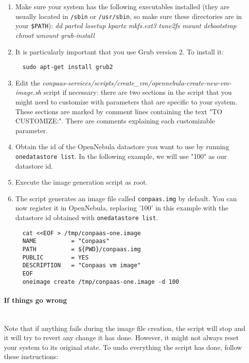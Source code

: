 \documentclass[10pt]{article}
\begin{document}
\begin{enumerate}
\item Make sure your system has the following executables installed
  (they are usually located in \verb+/sbin+ or \verb+/usr/sbin+, so
  make sure these directories are in your \verb+$PATH+): %
  \emph{dd parted losetup kpartx mkfs.ext3 tune2fs mount debootstrap
    chroot umount grub-install}
\item It is particularly important that you use Grub version 2. To
  install it:
  \begin{verbatim}
  sudo apt-get install grub2
  \end{verbatim}
\item Edit the
  \textit{conpaas-services/scripts/create\_vm/opennebula-create-new-vm-image.sh} script
  if necessary: there are two sections in the script that you might need
  to customize with parameters that are specific to your system. These
  sections are marked by comment lines containing the text "TO CUSTOMIZE:".
  There are comments explaining each customizable parameter. 
\item Obtain the id of the OpenNebula datastore you want to use by running
  \verb+onedatastore list+. In the following example, we will use "100" as our datastore id.
\item Execute the image generation script as root.
\item The script generates an image file called \verb+conpaas.img+ by default.
You can now register it in OpenNebula, replacing '100' in this example with the
datastore id obtained with \verb+onedatastore list+.

\vspace{10 mm}

\begin{verbatim}
  cat <<EOF > /tmp/conpaas-one.image
  NAME          = "Conpaas"
  PATH          = ${PWD}/conpaas.img
  PUBLIC        = YES
  DESCRIPTION   = "Conpaas vm image"
  EOF
  oneimage create /tmp/conpaas-one.image -d 100
\end{verbatim}
\end{enumerate}

\paragraph{If things go wrong}~\\

Note that if anything fails during the image file creation, the script will
stop and it will try to revert any change it has done. However, it might not
always reset your system to its original state. To undo everything the script
has done, follow these instructions:
\end{document}
